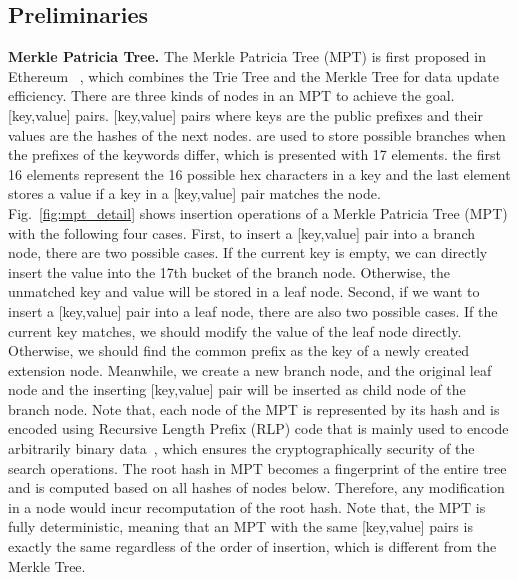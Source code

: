 


\subsection{Preliminaries}
\noindent\textbf{Merkle Patricia Tree.} The Merkle Patricia Tree (MPT) is first proposed in Ethereum~ \cite{wood2014ethereum, merkle_patricia_tree}, which combines the Trie Tree and the Merkle Tree for data update efficiency. There are three kinds of nodes in an MPT to achieve the goal.  [key,value] pairs.  [key,value] pairs where keys are the public prefixes and their values are the hashes of the next nodes.  are used to store possible branches when the prefixes of the keywords differ, which is presented with 17 elements.  the first 16 elements represent the 16 possible hex characters in a key and the last element stores a value if a key in a [key,value] pair matches the node. Fig.~\ref{fig:mpt_detail} shows insertion operations of a Merkle Patricia Tree (MPT) with the following four cases. First, to insert a [key,value] pair into a branch node, there are two possible cases. If the current key is empty, we can directly insert the value into the 17th bucket of the branch node. Otherwise, the unmatched key and value will be stored in a leaf node. Second, if we want to insert a [key,value] pair into a leaf node, there are also two possible cases. If the current key matches, we should modify the value of the leaf node directly. Otherwise, we should find the common prefix as the key of a newly created extension node. Meanwhile, we create a new branch node, and the original leaf node and the inserting [key,value] pair will be inserted as child node of the branch node.
Note that, each node of the MPT is represented by its hash and is encoded using Recursive Length Prefix (RLP) code that is mainly used to encode arbitrarily binary data~\cite{RLP_code}, which ensures the cryptographically security of the search operations. The root hash in MPT becomes a fingerprint of the entire tree and is computed based on all hashes of nodes below. Therefore, any modification in a node would incur recomputation of the root hash. Note that, the MPT is fully deterministic, meaning that an MPT with the same [key,value] pairs is exactly the same regardless of the order of insertion, which is different from the Merkle Tree.



